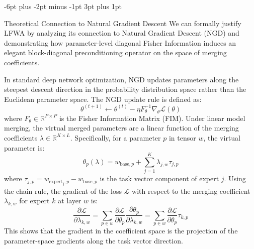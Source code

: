 \documentclass{article}
\makeatletter
\theoremstyle{plain}
\theoremstyle{definition}
\theoremstyle{remark}
\renewcommand{\subsection}{\@startsection{subsection}{2}{\z@}%
                          {-6pt plus -2pt minus -1pt}%
                          {3pt plus 1pt}%
                          {\normalfont\normalsize\bfseries\raggedright}}
\makeatother
\begin{document}
\subsection{Theoretical Connection to Natural Gradient Descent}
We can formally justify LFWA by analyzing its connection to Natural Gradient Descent (NGD) \cite{amari1998natural} and demonstrating how parameter-level diagonal Fisher Information induces an elegant block-diagonal preconditioning operator on the space of merging coefficients.

In standard deep network optimization, NGD updates parameters along the steepest descent direction in the probability distribution space rather than the Euclidean parameter space. The NGD update rule is defined as:
\begin{equation}
\theta^{(t+1)} \leftarrow \theta^{(t)} - \eta F_{\theta}^{-1} \nabla_\theta \mathcal{L}(\theta)
\end{equation}
where $F_\theta \in \mathbb{R}^{P \times P}$ is the Fisher Information Matrix (FIM). Under linear model merging, the virtual merged parameters are a linear function of the merging coefficients $\lambda \in \mathbb{R}^{K \times L}$. Specifically, for a parameter $p$ in tensor $w$, the virtual parameter is:
\begin{equation}
\theta_p(\lambda) = w_{\text{base}, p} + \sum_{j=1}^K \lambda_{j, w} \tau_{j, p}
\end{equation}
where $\tau_{j, p} = w_{\text{expert}_j, p} - w_{\text{base}, p}$ is the task vector component of expert $j$. Using the chain rule, the gradient of the loss $\mathcal{L}$ with respect to the merging coefficient $\lambda_{k, w}$ for expert $k$ at layer $w$ is:
\begin{equation}
\frac{\partial \mathcal{L}}{\partial \lambda_{k, w}} = \sum_{p \in w} \frac{\partial \mathcal{L}}{\partial \theta_p} \frac{\partial \theta_p}{\partial \lambda_{k, w}} = \sum_{p \in w} \frac{\partial \mathcal{L}}{\partial \theta_p} \tau_{k, p}
\end{equation}
This shows that the gradient in the coefficient space is the projection of the parameter-space gradients along the task vector direction.
\end{document}
